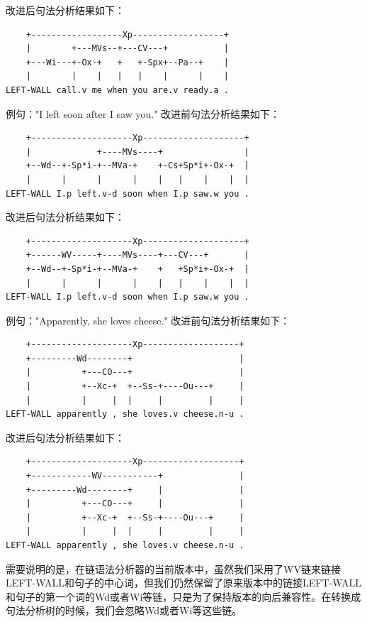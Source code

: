 改进后句法分析结果如下：
\begin{verbatim}
    +------------------Xp------------------+
    |        +---MVs--+---CV---+           |
    +---Wi---+-Ox-+   +   +-Spx+--Pa--+    |
    |        |    |   |   |    |      |    |
LEFT-WALL call.v me when you are.v ready.a .
\end{verbatim}

例句："I left soon after I saw you."
改进前句法分析结果如下：
\begin{verbatim}
    +--------------------Xp--------------------+
    |             +----MVs----+                |
    +--Wd--+-Sp*i-+--MVa-+    +-Cs+Sp*i+-Ox-+  |
    |      |      |      |    |   |    |    |  |
LEFT-WALL I.p left.v-d soon when I.p saw.w you .
\end{verbatim}

改进后句法分析结果如下：
\begin{verbatim}
    +--------------------Xp--------------------+
    +------WV-----+----MVs----+---CV---+       |
    +--Wd--+-Sp*i-+--MVa-+    +   +Sp*i+-Ox-+  |
    |      |      |      |    |   |    |    |  |
LEFT-WALL I.p left.v-d soon when I.p saw.w you .
\end{verbatim}

例句："Apparently, she loves cheese."
改进前句法分析结果如下：
\begin{verbatim}
    +--------------------Xp-------------------+
    +---------Wd--------+                     |
    |          +---CO---+                     |
    |          +--Xc-+  +--Ss-+----Ou---+     |
    |          |     |  |     |         |     |
LEFT-WALL apparently , she loves.v cheese.n-u .
\end{verbatim}

改进后句法分析结果如下：

\begin{verbatim}
    +--------------------Xp-------------------+
    +------------WV-----------+               |
    +---------Wd--------+     |               |
    |          +---CO---+     |               |
    |          +--Xc-+  +--Ss-+----Ou---+     |
    |          |     |  |     |         |     |
LEFT-WALL apparently , she loves.v cheese.n-u .
\end{verbatim}

需要说明的是，在链语法分析器的当前版本中，虽然我们采用了WV链来链接LEFT-WALL和句子的中心词，但我们仍然保留了原来版本中的链接LEFT-WALL和句子的第一个词的Wd或者Wi等链，只是为了保持版本的向后兼容性。在转换成句法分析树的时候，我们会忽略Wd或者Wi等这些链。

